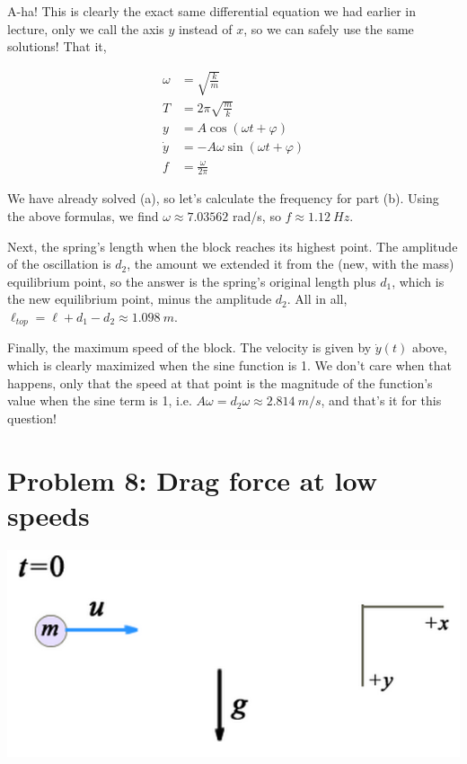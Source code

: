 \documentclass[12pt,a4paper]{report}
\begin{document}
A-ha! This is clearly the exact same differential equation we had earlier in lecture, only we call the axis $y$ instead of $x$, so we can safely use the same solutions! That it,

\begin{align}
\omega &= \sqrt{\frac{k}{m}}\\
T &= 2 \pi \sqrt{\frac{m}{k}}\\
y &= A \cos (\omega t + \varphi)\\
\dot{y} &= -A \omega \sin(\omega t + \varphi)\\
f &= \frac{\omega}{2\pi}
\end{align}

We have already solved (a), so let's calculate the frequency for part (b). Using the above formulas, we find $\omega \approx 7.03562$ rad/s, so $f \approx \SI{1.12}{Hz}$.

Next, the spring's length when the block reaches its highest point. The amplitude of the oscillation is $d_2$, the amount we extended it from the (new, with the mass) equilibrium point, so the answer is the spring's original length plus $d_1$, which is the new equilibrium point, minus the amplitude $d_2$. All in all, $\ell_{top} = \ell + d_1 - d_2 \approx \SI{1.098}{m}$.

Finally, the maximum speed of the block. The velocity is given by $\dot{y}(t)$ above, which is clearly maximized when the sine function is 1. We don't care when that happens, only that the speed at that point is the magnitude of the function's value when the sine term is 1, i.e. $A \omega = d_2 \omega \approx \SI{2.814}{m/s}$, and that's it for this question!

\section{Problem 8: Drag force at low speeds}

\begin{center}
\includegraphics[scale=0.6]{Graphics/h4p8}
\end{center}
\end{document}
